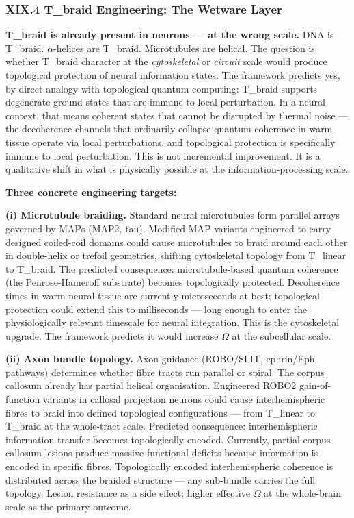 \documentclass[12pt,a4paper]{article}
\begin{document}
\subsubsection{XIX.4 T\_braid Engineering: The Wetware Layer}

\textbf{T\_braid is already present in neurons --- at the wrong scale.} DNA is T\_braid. $\alpha$-helices are T\_braid. Microtubules are helical. The question is whether T\_braid character at the \emph{cytoskeletal} or \emph{circuit} scale would produce topological protection of neural information states. The framework predicts yes, by direct analogy with topological quantum computing: T\_braid supports degenerate ground states that are immune to local perturbation. In a neural context, that means coherent states that cannot be disrupted by thermal noise --- the decoherence channels that ordinarily collapse quantum coherence in warm tissue operate via local perturbations, and topological protection is specifically immune to local perturbation. This is not incremental improvement. It is a qualitative shift in what is physically possible at the information-processing scale.

\textbf{Three concrete engineering targets:}

\textbf{(i) Microtubule braiding.} Standard neural microtubules form parallel arrays governed by MAPs (MAP2, tau). Modified MAP variants engineered to carry designed coiled-coil domains could cause microtubules to braid around each other in double-helix or trefoil geometries, shifting cytoskeletal topology from T\_linear to T\_braid. The predicted consequence: microtubule-based quantum coherence (the Penrose-Hameroff substrate) becomes topologically protected. Decoherence times in warm neural tissue are currently microseconds at best; topological protection could extend this to milliseconds --- long enough to enter the physiologically relevant timescale for neural integration. This is the cytoskeletal upgrade. The framework predicts it would increase $\Omega$ at the subcellular scale.

\textbf{(ii) Axon bundle topology.} Axon guidance (ROBO/SLIT, ephrin/Eph pathways) determines whether fibre tracts run parallel or spiral. The corpus callosum already has partial helical organisation. Engineered ROBO2 gain-of-function variants in callosal projection neurons could cause interhemispheric fibres to braid into defined topological configurations --- from T\_linear to T\_braid at the whole-tract scale. Predicted consequence: interhemispheric information transfer becomes topologically encoded. Currently, partial corpus callosum lesions produce massive functional deficits because information is encoded in specific fibres. Topologically encoded interhemispheric coherence is distributed across the braided structure --- any sub-bundle carries the full topology. Lesion resistance as a side effect; higher effective $\Omega$ at the whole-brain scale as the primary outcome.
\end{document}
